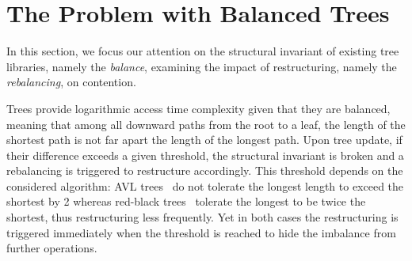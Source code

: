 % 

\section{The Problem with Balanced Trees}\label{sec:pb}

In this section, we focus our attention 
on the structural invariant of existing tree libraries, namely 
the \emph{balance}, examining the impact of restructuring, namely the \emph{rebalancing}, on contention.

Trees provide logarithmic access time complexity given that they are balanced, 
meaning that among all downward paths from the root to a leaf, the length of the shortest path 
is not far apart the length of the longest path. Upon tree update, if their difference exceeds a given threshold, the structural invariant is broken and a rebalancing is triggered to restructure accordingly. 
%
This threshold depends on the considered algorithm: AVL trees~\cite{AVL62} do not tolerate 
the longest length to exceed the shortest by 2 whereas red-black trees~\cite{Bay72} tolerate 
the longest to be twice the shortest, thus restructuring less frequently.  Yet in both cases
the restructuring is triggered immediately when the threshold is reached to hide the imbalance from further operations.

